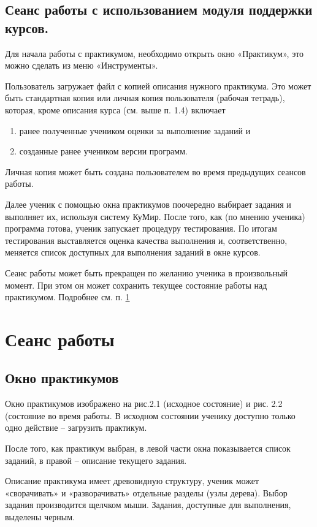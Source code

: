 \subsection {Сеанс работы с использованием модуля поддержки курсов. } \label {seans}
Для начала работы с практикумом, необходимо открыть окно «Практикум», это можно сделать из меню «Инструменты».
	
Пользователь загружает файл с копией описания нужного практикума. Это может быть стандартная копия или личная копия пользователя (рабочая тетрадь), которая, кроме описания курса (см. выше п. 1.4) включает
\begin{enumerate}
	\item ранее полученные учеником оценки за выполнение заданий и 
	\item созданные ранее учеником версии программ. 
\end{enumerate}
Личная копия может быть создана пользователем во время предыдущих сеансов работы. 

	Далее ученик с помощью окна практикумов поочередно выбирает задания и выполняет их, используя систему КуМир. После того, как (по мнению ученика) программа готова, ученик запускает процедуру тестирования. По итогам тестирования выставляется оценка качества выполнения и, соответственно, меняется список доступных для выполнения заданий в окне курсов.

	Сеанс работы может быть прекращен по желанию ученика в произвольный момент. При этом он может сохранить текущее состояние работы над практикумом. Подробнее см. п. \ref{seans_s}

\section {Сеанс работы }\label{seans_s}

\subsection {Окно  практикумов }\label{window}
Окно практикумов изображено на рис.2.1 (исходное состояние) и рис. 2.2 (состояние во время работы. В исходном состоянии ученику доступно только одно действие – загрузить практикум. 
	
	После того, как практикум выбран, в левой части окна показывается список заданий, в правой – описание текущего задания.
	
	Описание практикума имеет древовидную структуру, ученик может «сворачивать» и «разворачивать» отдельные разделы (узлы дерева). Выбор задания производится щелчком мыши. Задания, доступные для выполнения, выделены черным.


